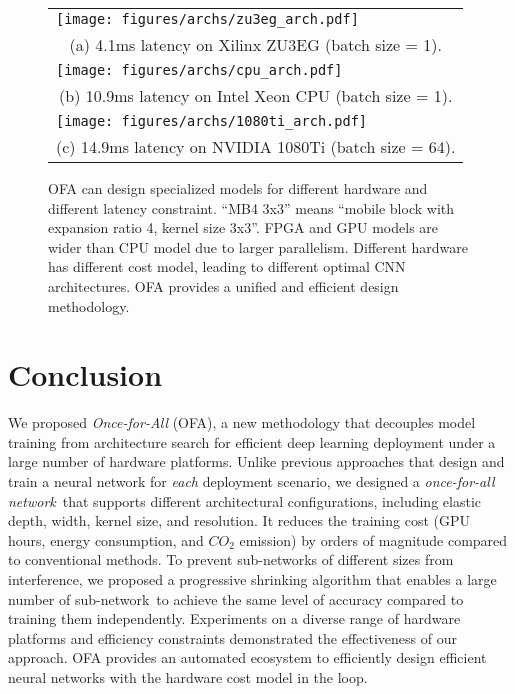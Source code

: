 \documentclass{article} \usepackage{iclr2020_conference,times}
\newcommand{\motherNet}{once-for-all network}
\newcommand{\childNet}{sub-network}
\begin{document}
\begin{figure}[ht]
    \centering
    \begin{tabular}{l}
        \begin{minipage}{0.75\linewidth}
            \texttt{[image: figures/archs/zu3eg\_arch.pdf]}
        \end{minipage}
        \\
        \multicolumn{1}{c}{ (a) 4.1ms latency on Xilinx ZU3EG (batch size = 1).}
        \vspace{6pt}
        \\
        \begin{minipage}{0.75\linewidth}
            \texttt{[image: figures/archs/cpu\_arch.pdf]}
        \end{minipage}
        \\
        \multicolumn{1}{c}{ (b) 10.9ms latency on Intel Xeon CPU (batch size = 1).}
        \vspace{6pt}
        \\
        \begin{minipage}{0.999\linewidth}
            \texttt{[image: figures/archs/1080ti\_arch.pdf]}
        \end{minipage}
        \\
        \multicolumn{1}{c}{ (c) 14.9ms latency on NVIDIA 1080Ti (batch size = 64).}
    \end{tabular}
    \caption{OFA can design specialized models for different hardware and different latency constraint. ``MB4 3x3'' means ``mobile block with expansion ratio 4, kernel size 3x3''. FPGA and GPU models are wider than CPU model due to larger parallelism. Different hardware has different cost model, leading to different optimal CNN architectures. OFA provides a unified and efficient design methodology.}
    \label{fig:model_architectures}
\end{figure} 
\section{Conclusion}
We proposed \textit{Once-for-All} (OFA), a new methodology that decouples model training from architecture search for efficient deep learning deployment under a large number of hardware platforms. Unlike previous approaches that design and train a neural network for \textit{each} deployment scenario, we designed a \textit{\motherNet}~that supports different architectural configurations, including elastic depth, width, kernel size, and resolution. It reduces the training cost (GPU hours, energy consumption, and $CO_2$ emission) by orders of magnitude compared to conventional methods. 
To prevent sub-networks of different sizes from interference, we proposed a progressive shrinking algorithm that enables a large number of \childNet~to achieve the same level of accuracy compared to training them independently. 
Experiments on a diverse range of hardware platforms and efficiency constraints demonstrated the effectiveness of our approach. OFA provides an automated ecosystem to efficiently design efficient neural networks with the hardware cost model in the loop. 
\end{document}
